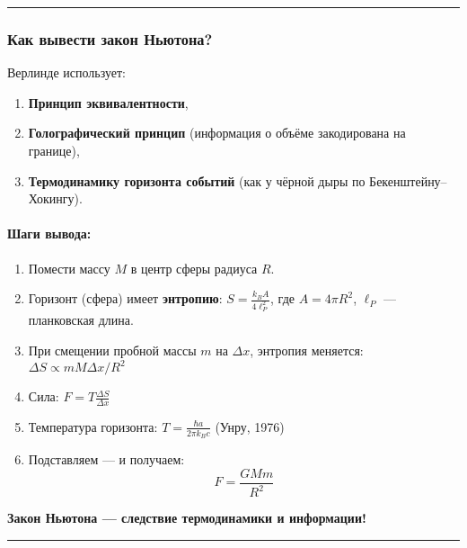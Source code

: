 \documentclass[11pt]{article}
\providecommand{\tightlist}{%
      \setlength{\itemsep}{0pt}\setlength{\parskip}{0pt}}
\begin{document}
\begin{center}\rule{0.5\linewidth}{\linethickness}\end{center}

\subsubsection{Как вывести закон
Ньютона?}\label{ux43aux430ux43a-ux432ux44bux432ux435ux441ux442ux438-ux437ux430ux43aux43eux43d-ux43dux44cux44eux442ux43eux43dux430}

Верлинде использует:

\begin{enumerate}
\def\labelenumi{\arabic{enumi}.}
\tightlist
\item
  \textbf{Принцип эквивалентности},
\item
  \textbf{Голографический принцип} (информация о объёме закодирована на
  границе),
\item
  \textbf{Термодинамику горизонта событий} (как у чёрной дыры по
  Бекенштейну--Хокингу).
\end{enumerate}

\paragraph{Шаги
вывода:}\label{ux448ux430ux433ux438-ux432ux44bux432ux43eux434ux430}

\begin{enumerate}
\def\labelenumi{\arabic{enumi}.}
\tightlist
\item
  Помести массу \(M\) в центр сферы радиуса \(R\).
\item
  Горизонт (сфера) имеет \textbf{энтропию}:
  \(S = \frac{k_B A}{4 \ell_P^2}\), где \(A = 4\pi R^2\), \(\ell_P\) ---
  планковская длина.
\item
  При смещении пробной массы \(m\) на \(\Delta x\), энтропия меняется:
  \(\Delta S \propto m M \Delta x / R^2\)
\item
  Сила: \(F = T \frac{\Delta S}{\Delta x}\)
\item
  Температура горизонта: \(T = \frac{\hbar a}{2\pi k_B c}\) (Унру, 1976)
\item
  Подставляем --- и получаем:\\
  \[
     F = \frac{G M m}{R^2}
     \]
\end{enumerate}

\textbf{Закон Ньютона --- следствие термодинамики и информации!}

\begin{center}\rule{0.5\linewidth}{\linethickness}\end{center}
\end{document}
